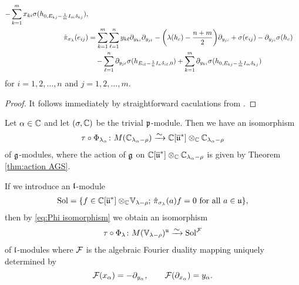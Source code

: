 \begin{theorem}
\begin{enumerate}
\begin{align}
\begin{aligned}
     - \sum_{k=1}^m x_{ki} \sigma(h_{0,E_{kj}-{1 \over m}I_m \delta_{kj}}),  \\
    \hat{\pi}_{\sigma_\lambda}(e_{ij})&= \sum_{k=1}^m \sum_{\ell=1}^n y_{k\ell} \partial_{y_{ki}} \partial_{y_{j\ell}} - \bigg(\lambda(h_c)-  {n+m \over 2}\bigg) \partial_{y_{ji}} + \sigma(e_{ij}) - \partial_{y_{ji}} \sigma(h_c)
    \\ &\quad - \sum_{\ell=1}^n \partial_{y_{j\ell}} \sigma(h_{E_{i\ell}-{1\over n}I_n \delta_{i \ell},0})
     + \sum_{k=1}^m \partial_{y_{ki}} \sigma(h_{0,E_{kj}-{1 \over m}I_m \delta_{kj}})
  \end{aligned}
\end{align}
for $i=1,2,\dots,n$ and $j=1,2,\dots,m$.
\end{enumerate}
\end{theorem}

\begin{proof}
It follows immediately by straightforward caculations from \cite{krizka_contact}.
\end{proof}


Let $\alpha \in \mathbb{C}$ and let $(\sigma,\mathbb{C})$ be the trivial $\mathfrak{p}$-module. Then we have an isomorphism
\begin{align}\label{eq:Phi isomorphism}
  \tau \circ \Phi_{\lambda_\alpha} \colon M(\C_{\lambda_\alpha-\rho}) \riso \C[\widebar{\mfrak{u}}^*] \otimes_\C \C_{\lambda_\alpha-\rho}
\end{align}
of $\mathfrak{g}$-modules, where the action of $\mathfrak{g}$ on $\mathbb{C}[\overline{\mathfrak{u}}^*] \otimes_{\mathbb{C}} \mathbb{C}_{\lambda_\alpha-\rho}$ is given by Theorem \ref{thm:action AGS}.
\medskip

If we introduce an $\mathfrak{l}$-module
\begin{align}
  \Sol = \{f \in \C[\widebar{\mfrak{u}}^*] \otimes_\C \!\mathbb{V}_{\lambda-\rho};\, \hat{\pi}_{\sigma_\lambda}(a)f=0\ \text{for all}\ a \in \mfrak{u}\},
\end{align}
then by \eqref{eq:Phi isomorphism} we obtain an isomorphism
\begin{align}
  \tau \circ \Phi_\lambda \colon M(\mathbb{V}_{\lambda-\rho})^\mfrak{u} \riso \Sol^\mcal{F}
\end{align}
of $\mathfrak{l}$-modules where $\mathcal{F}$ is the algebraic Fourier duality mapping uniquely determined by 
\begin{equation*}
  \mathcal{F}(x_\alpha) = -\partial_{y_\alpha}, \qquad \mathcal{F}(\partial_{x_\alpha})= y_\alpha.
\end{equation*}

